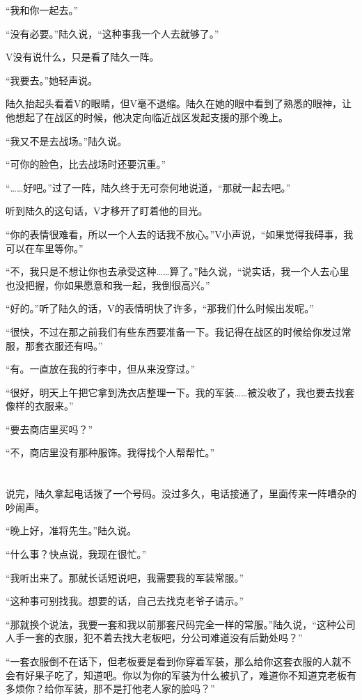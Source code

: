 “我和你一起去。”

“没有必要。”陆久说，“这种事我一个人去就够了。”

V没有说什么，只是看了陆久一阵。

“我要去。”她轻声说。

陆久抬起头看着V的眼睛，但V毫不退缩。陆久在她的眼中看到了熟悉的眼神，让他想起了在战区的时候，他决定向临近战区发起支援的那个晚上。

“我又不是去战场。”陆久说。

“可你的脸色，比去战场时还要沉重。”

“……好吧。”过了一阵，陆久终于无可奈何地说道，“那就一起去吧。”

听到陆久的这句话，V才移开了盯着他的目光。

“你的表情很难看，所以一个人去的话我不放心。”V小声说，“如果觉得我碍事，我可以在车里等你。”

“不，我只是不想让你也去承受这种……算了。”陆久说，“说实话，我一个人去心里也没把握，你如果愿意和我一起，我倒很高兴。”

“好的。”听了陆久的话，V的表情明快了许多，“那我们什么时候出发呢。”

“很快，不过在那之前我们有些东西要准备一下。我记得在战区的时候给你发过常服，那套衣服还有吗。”

“有。一直放在我的行李中，但从来没穿过。”

“很好，明天上午把它拿到洗衣店整理一下。我的军装……被没收了，我也要去找套像样的衣服来。”

“要去商店里买吗？”

“不，商店里没有那种服饰。我得找个人帮帮忙。”

\section*{}

说完，陆久拿起电话拨了一个号码。没过多久，电话接通了，里面传来一阵嘈杂的吵闹声。

“晚上好，准将先生。”陆久说。

“什么事？快点说，我现在很忙。”

“我听出来了。那就长话短说吧，我需要我的军装常服。”

“这种事可别找我。想要的话，自己去找克老爷子请示。”

“那就换个说法，我要一套和我以前那套尺码完全一样的常服。”陆久说，“这种公司人手一套的衣服，犯不着去找大老板吧，分公司难道没有后勤处吗？”

“一套衣服倒不在话下，但老板要是看到你穿着军装，那么给你这套衣服的人就不会有好果子吃了，知道吧。你以为你的军装为什么被扒了，难道你不知道克老板有多烦你？给你军装，那不是打他老人家的脸吗？”

